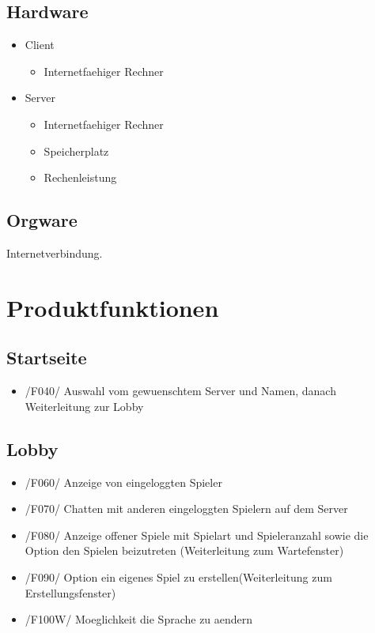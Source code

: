 \documentclass{article}
\begin{document}
\subsection{Hardware}
\begin{itemize}
		\item Client
		\begin{itemize}
			\item Internetfaehiger Rechner
		\end{itemize}
		\item Server
		\begin{itemize}
			\item Internetfaehiger Rechner	
			\item Speicherplatz
			\item Rechenleistung
		\end{itemize}
	\end{itemize}

\subsection{Orgware}
Internetverbindung.

\section{Produktfunktionen}
\subsection{Startseite}
\begin{itemize}
	\item /F040/ Auswahl vom gewuenschtem Server und Namen, danach Weiterleitung zur Lobby
\end{itemize}

\subsection{Lobby}
\begin{itemize}
	\item /F060/ Anzeige von eingeloggten Spieler
	\item /F070/ Chatten mit anderen eingeloggten Spielern auf dem Server
	\item /F080/ Anzeige offener Spiele mit Spielart und Spieleranzahl sowie die Option den Spielen beizutreten (Weiterleitung zum Wartefenster)
	\item /F090/ Option ein eigenes Spiel zu erstellen(Weiterleitung zum Erstellungsfenster)
	\item /F100W/ Moeglichkeit die Sprache zu aendern
\end{itemize}
\end{document}
